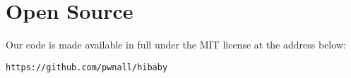 \section{Open Source}

Our code is made available in full under the MIT license at the address below:


\texttt{https://github.com/pwnall/hibaby}
